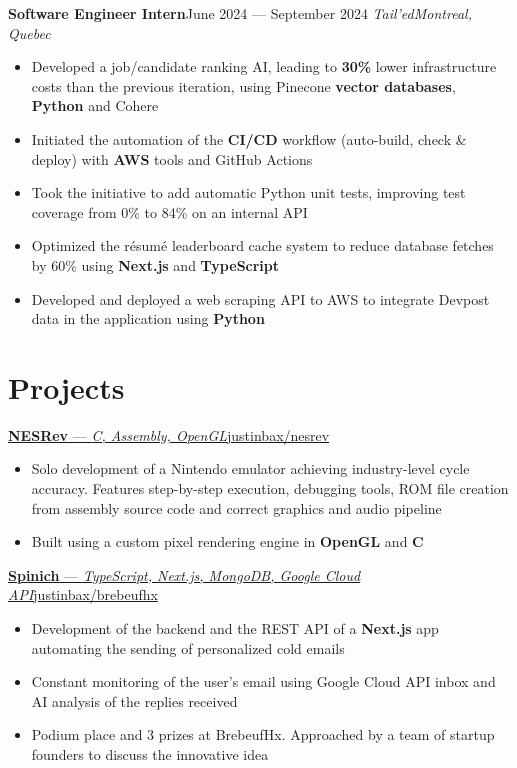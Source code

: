 \documentclass{article}
\newcommand{\newrole}[4]{
    {\normalfont\textbf{#1}\hfill#3}
    \newline
    \textit{#2}\hfill\textit{#4}
}
\newcommand{\shortlinkrole}[4]{
    {\href{#3}{\normalfont\textbf{#1} --- \textit{#2}\hfill#4\:\faExternalLink}\vspace*{-4pt}}
}
\newenvironment{bulletpoints}{\begin{itemize}\setlength\itemsep{-0.2em}}{\end{itemize}}
\begin{document}
\newrole{Software Engineer Intern}{Tail'ed}{June 2024 --- September 2024}{Montreal, Quebec}
\begin{bulletpoints}
    \item Developed a job/candidate ranking AI, leading to \textbf{30\%} lower infrastructure costs than the previous iteration, using Pinecone \textbf{vector databases}, \textbf{Python} and Cohere
    \item Initiated the automation of the \textbf{CI/CD} workflow (auto-build, check \& deploy) with \textbf{AWS} tools and GitHub Actions
    \item Took the initiative to add automatic Python unit tests, improving test coverage from 0\% to 84\% on an internal API
    \item Optimized the résumé leaderboard cache system to reduce database fetches by 60\% using \textbf{Next.js} and \textbf{TypeScript}
    \item Developed and deployed a web scraping API to AWS to integrate Devpost data in the application using \textbf{Python}
\end{bulletpoints}


\section*{Projects}

\shortlinkrole{NESRev}{C, Assembly, OpenGL}{https://github.com/justinbax/nesrev}{justinbax/nesrev}
\begin{bulletpoints}
    \item Solo development of a Nintendo emulator achieving industry-level cycle accuracy. Features step-by-step execution, debugging tools, ROM file creation from assembly source code and correct graphics and audio pipeline
    \item Built using a custom pixel rendering engine in \textbf{OpenGL} and \textbf{C}
\end{bulletpoints}

\shortlinkrole{Spinich}{TypeScript, Next.js, MongoDB, Google Cloud API}{https://github.com/justinbax/brebeufhx}{justinbax/brebeufhx}
\begin{bulletpoints}
    \item Development of the backend and the REST API of a \textbf{Next.js} app automating the sending of personalized cold emails
    \item Constant monitoring of the user's email using Google Cloud API inbox and AI analysis of the replies received
    \item Podium place and 3 prizes at BrebeufHx. Approached by a team of startup founders to discuss the innovative idea
\end{bulletpoints}
\end{document}
